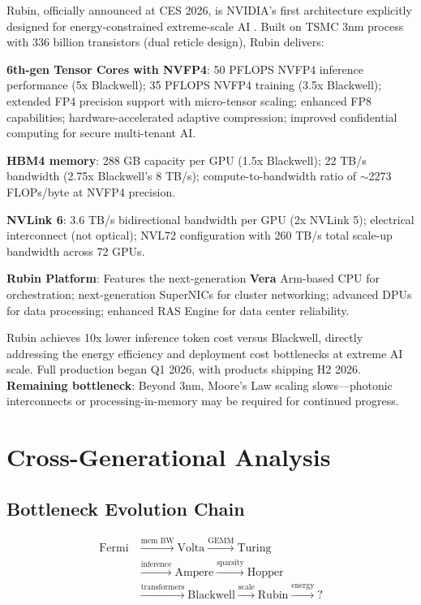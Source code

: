 \documentclass{article}
\begin{document}
Rubin, officially announced at CES 2026, is NVIDIA's first architecture explicitly designed for energy-constrained extreme-scale AI \cite{nvidia2024rubin}. Built on TSMC 3nm process with 336 billion transistors (dual reticle design), Rubin delivers:

\textbf{6th-gen Tensor Cores with NVFP4}: 50 PFLOPS NVFP4 inference performance (5x Blackwell); 35 PFLOPS NVFP4 training (3.5x Blackwell); extended FP4 precision support with micro-tensor scaling; enhanced FP8 capabilities; hardware-accelerated adaptive compression; improved confidential computing for secure multi-tenant AI.

\textbf{HBM4 memory}: 288 GB capacity per GPU (1.5x Blackwell); 22 TB/s bandwidth (2.75x Blackwell's 8 TB/s); compute-to-bandwidth ratio of $\sim$2273 FLOPs/byte at NVFP4 precision.

\textbf{NVLink 6}: 3.6 TB/s bidirectional bandwidth per GPU (2x NVLink 5); electrical interconnect (not optical); NVL72 configuration with 260 TB/s total scale-up bandwidth across 72 GPUs.

\textbf{Rubin Platform}: Features the next-generation \textbf{Vera} Arm-based CPU for orchestration; next-generation SuperNICs for cluster networking; advanced DPUs for data processing; enhanced RAS Engine for data center reliability.

Rubin achieves 10x lower inference token cost versus Blackwell, directly addressing the energy efficiency and deployment cost bottlenecks at extreme AI scale. Full production began Q1 2026, with products shipping H2 2026. \textbf{Remaining bottleneck}: Beyond 3nm, Moore's Law scaling slows---photonic interconnects or processing-in-memory may be required for continued progress.

\section{Cross-Generational Analysis}

\subsection{Bottleneck Evolution Chain}

\begin{equation}
\begin{aligned}
\text{Fermi} &\xrightarrow{\text{mem BW}} \text{Volta} \xrightarrow{\text{GEMM}} \text{Turing} \\
&\xrightarrow{\text{inference}} \text{Ampere} \xrightarrow{\text{sparsity}} \text{Hopper} \\
&\xrightarrow{\text{transformers}} \text{Blackwell} \xrightarrow{\text{scale}} \text{Rubin} \xrightarrow{\text{energy}} \text{?}
\end{aligned}
\end{equation}
\end{document}

